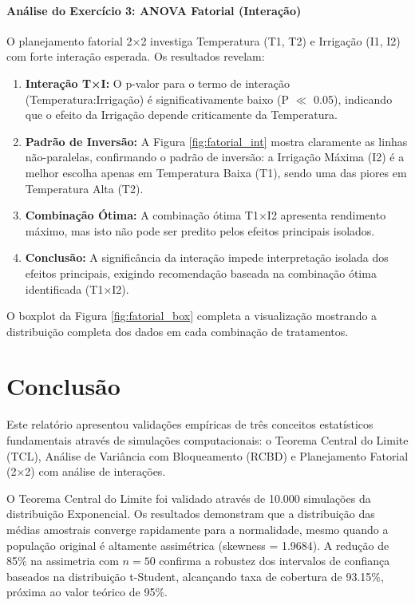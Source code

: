 \documentclass[12pt,a4paper,oneside]{article}
\begin{document}
\paragraph{Análise do Exercício 3: ANOVA Fatorial (Interação)}

O planejamento fatorial 2×2 investiga Temperatura (T1, T2) e Irrigação (I1, I2) com forte interação esperada. Os resultados revelam:

\begin{enumerate}
    \item \textbf{Interação T×I:} O p-valor para o termo de interação (Temperatura:Irrigação) é significativamente baixo (P $\ll$ 0.05), indicando que o efeito da Irrigação depende criticamente da Temperatura.
    \item \textbf{Padrão de Inversão:} A Figura \ref{fig:fatorial_int} mostra claramente as linhas não-paralelas, confirmando o padrão de inversão: a Irrigação Máxima (I2) é a melhor escolha apenas em Temperatura Baixa (T1), sendo uma das piores em Temperatura Alta (T2).
    \item \textbf{Combinação Ótima:} A combinação ótima T1×I2 apresenta rendimento máximo, mas isto não pode ser predito pelos efeitos principais isolados.
    \item \textbf{Conclusão:} A significância da interação impede interpretação isolada dos efeitos principais, exigindo recomendação baseada na combinação ótima identificada (T1×I2).
\end{enumerate}

O boxplot da Figura \ref{fig:fatorial_box} completa a visualização mostrando a distribuição completa dos dados em cada combinação de tratamentos.

\section{Conclusão}

Este relatório apresentou validações empíricas de três conceitos estatísticos fundamentais através de simulações computacionais: o Teorema Central do Limite (TCL), Análise de Variância com Bloqueamento (RCBD) e Planejamento Fatorial (2×2) com análise de interações.

O Teorema Central do Limite foi validado através de 10.000 simulações da distribuição Exponencial. Os resultados demonstram que a distribuição das médias amostrais converge rapidamente para a normalidade, mesmo quando a população original é altamente assimétrica (skewness = 1.9684). A redução de 85\% na assimetria com $n=50$ confirma a robustez dos intervalos de confiança baseados na distribuição t-Student, alcançando taxa de cobertura de 93.15\%, próxima ao valor teórico de 95\%.
\end{document}
